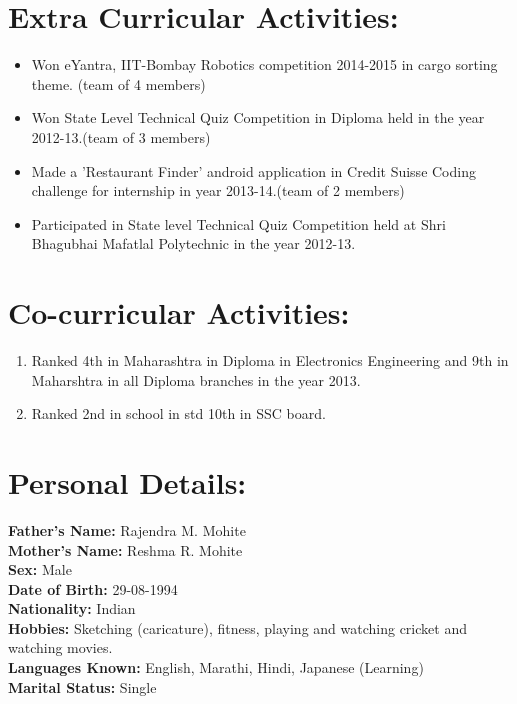 \documentclass[a4 paper,12pt]{article}
\begin{document}
\begin{minipage}{0.98\textwidth}
\section{Extra Curricular Activities:}
\begin{itemize}
	\vspace{-0.1in}
	\item Won eYantra, IIT-Bombay Robotics competition 2014-2015 in cargo sorting theme. (team of 4 members)
	\item Won State Level Technical Quiz Competition in Diploma held in the year 2012-13.(team of 3 members)
	\item Made a 'Restaurant Finder' android application in Credit Suisse Coding challenge for internship in year 2013-14.(team of 2 members)
	\item Participated in State level Technical Quiz Competition held at Shri Bhagubhai Mafatlal Polytechnic in the year 2012-13.
\end{itemize}

\section{Co-curricular Activities:}
\begin{enumerate}
	\vspace{-0.1in}
	\item Ranked 4th in Maharashtra in Diploma in Electronics Engineering and 9th in Maharshtra in all Diploma branches in the year 2013.
	\item Ranked 2nd in school in std 10th in SSC board.
\end{enumerate}

\section{Personal Details:}
\vspace{-0.1in}
\textbf{Father's Name:} Rajendra M. Mohite\\\textbf{Mother's Name:} Reshma R. Mohite\\\textbf{Sex:} Male\\\textbf{Date of Birth:} 29-08-1994\\\textbf{Nationality:} Indian\\\textbf{Hobbies:} Sketching (caricature), fitness, playing and watching cricket and 
watching movies.\\\textbf{Languages Known:} English, Marathi, Hindi, Japanese (Learning)\\\textbf{Marital Status:} Single\\\\
\end{minipage}
\end{document}
